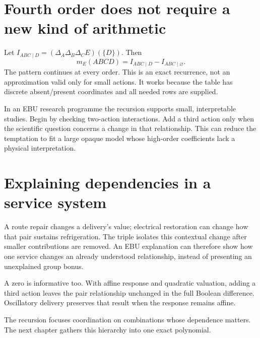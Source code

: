 \section{Fourth order does not require a new kind of arithmetic}
Let $I_{ABC\mid D}=(\Delta_A\Delta_B\Delta_C E)(\{D\})$. Then
\begin{equation}
 m_E(ABCD)=I_{ABC\mid D}-I_{ABC\mid\varnothing}.
\end{equation}
The pattern continues at every order. This is an exact recurrence, not an approximation valid only for small actions. It works because the table has discrete absent/present coordinates and all needed rows are supplied.

In an EBU research programme the recursion supports small, interpretable studies. Begin by checking two-action interactions. Add a third action only when the scientific question concerns a change in that relationship. This can reduce the temptation to fit a large opaque model whose high-order coefficients lack a physical interpretation.

\section{Explaining dependencies in a service system}
A route repair changes a delivery's value; electrical restoration can change how that pair sustains refrigeration. The triple isolates this contextual change after smaller contributions are removed. An EBU explanation can therefore show how one service changes an already understood relationship, instead of presenting an unexplained group bonus.

A zero is informative too. With affine response and quadratic valuation, adding a third action leaves the pair relationship unchanged in the full Boolean difference. Oscillatory delivery preserves that result when the response remains affine.

The recursion focuses coordination on combinations whose dependence matters. The next chapter gathers this hierarchy into one exact polynomial.
